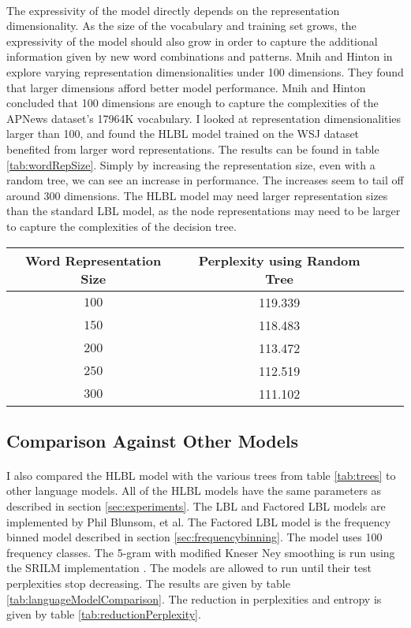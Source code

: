 \paragraph{}
The expressivity of the model directly depends on the representation dimensionality. As the size of the vocabulary and training set grows, the expressivity of the model should also grow in order to capture the additional information given by new word combinations and patterns. Mnih and Hinton in \cite{MnihHinton2009} explore varying representation dimensionalities under 100 dimensions. They found that larger dimensions afford better model performance. Mnih and Hinton concluded that 100 dimensions are enough to capture the complexities of the APNews dataset's 17964K vocabulary. I looked at representation dimensionalities larger than 100, and found the HLBL model trained on the WSJ dataset benefited from larger word representations. The results can be found in table \ref{tab:wordRepSize}. Simply by increasing the representation size, even with a random tree, we can see an increase in performance. The increases seem to tail off around 300 dimensions.  The HLBL model may need larger representation sizes than the standard LBL model, as the node representations may need to be larger to capture the complexities of the decision tree.


\begin{table*} \centering
{}
\begin{tabular}{@{}cccc@{}}\toprule
Word Representation Size & Perplexity using Random Tree\\ 
\midrule
$100$ & 119.339 \\
$150$ & 118.483 \\
$200$ & 113.472 \\
$250$ & 112.519 \\
$300$ & 111.102 \\
\bottomrule
\end{tabular}
\caption{The effect of word representation size on test perplexity.}
\label{tab:wordRepSize}
\end{table*}

\subsection{Comparison Against Other Models}
\paragraph{}
I also compared the HLBL model with the various trees from table \ref{tab:trees} to other language models. All of the HLBL models have the same parameters as described in section \ref{sec:experiments}. The LBL and Factored LBL models are implemented by Phil Blunsom, et al. The Factored LBL model is the frequency binned model described in section \ref{sec:frequencybinning}. The model uses 100 frequency classes. The 5-gram with modified Kneser Ney smoothing is run using the SRILM implementation \cite{Alumae2010}.
The models are allowed to run until their test perplexities stop decreasing. The results are given by table \ref{tab:languageModelComparison}. The reduction in perplexities and entropy is given by table \ref{tab:reductionPerplexity}. 


